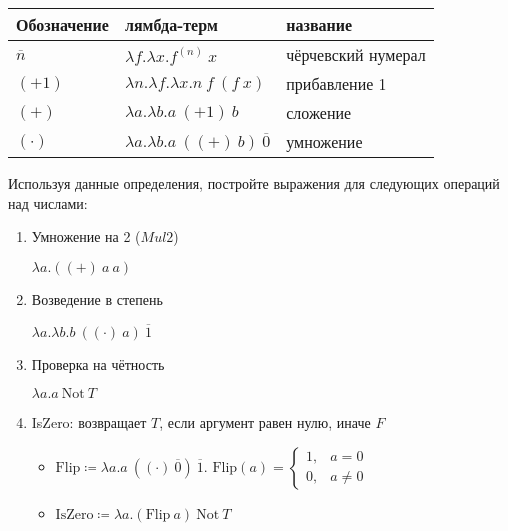 \begin{enumerate}
          \begin{center}\begin{tabular}{lll}
                  Обозначение    & лямбда-терм                                     & название           \\\hline
                  $\overline{n}$ & $\lambda f.\lambda x.f^{(n)}\ x$                & чёрчевский нумерал \\
                  $(+1)$         & $\lambda n.\lambda f.\lambda x.n\ f\ (f\ x)$    & прибавление 1      \\
                  $(+)$          & $\lambda a.\lambda b.a\ (+1)\ b$                & сложение           \\
                  $(\cdot)$      & $\lambda a.\lambda b.a\ ((+)\ b)\ \overline{0}$ & умножение
              \end{tabular}\end{center}

          Используя данные определения, постройте выражения для следующих операций над числами:

          \begin{enumerate}
              \item Умножение на 2 ($Mul2$)
                    \begin{solution}
                        \(\lambda a.((+)\ a\ a)\)
                    \end{solution}
              \item Возведение в степень
                    \begin{solution}
                        \(\lambda a.\lambda b.b\ ((\cdot)\ a)\ \overline{1}\)
                    \end{solution}
              \item Проверка на чётность
                    \begin{solution}
                        \(\lambda a.a\ \mathrm{Not}\ T\)
                    \end{solution}
              \item IsZero: возвращает $T$, если аргумент равен нулю, иначе $F$
                    \begin{solution}\itemfix
                        \begin{itemize}
                            \item \(\mathrm{Flip} \coloneqq \lambda a.a\ ((\cdot)\ \overline{0})\ \overline{1}\). \(\mathrm{Flip}(a) = \begin{cases}
                                      1, & a = 0    \\
                                      0, & a \neq 0
                                  \end{cases}\)
                            \item \(\mathrm{IsZero} \coloneqq \lambda a.(\mathrm{Flip}\ a)\ \mathrm{Not}\ T\)
                        \end{itemize}
                    \end{solution}
          \end{enumerate}


\end{enumerate}
